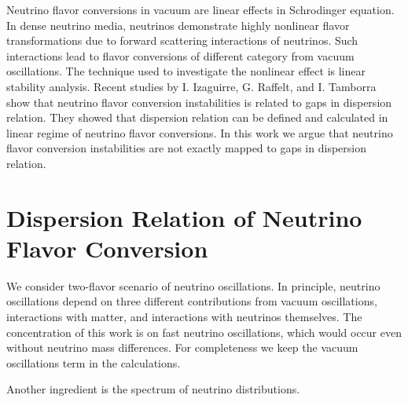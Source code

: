 \documentclass[%
 reprint,
 amsmath,amssymb,
 aps,
 prd
]{revtex4-1}
\begin{document}
Neutrino flavor conversions in vacuum are linear effects in Schrodinger equation. In dense neutrino media, neutrinos demonstrate highly nonlinear flavor transformations due to forward scattering interactions of neutrinos. Such interactions lead to flavor conversions of different category from vacuum oscillations. The technique used to investigate the nonlinear effect is linear stability analysis.\cite{Banerjee2011a,Raffelt2013} Recent studies by I. Izaguirre, G. Raffelt, and I. Tamborra show that neutrino flavor conversion instabilities is related to gaps in dispersion relation.\cite{Izaguirre2016a} They showed that dispersion relation can be defined and calculated in linear regime of neutrino flavor conversions. In this work we argue that neutrino flavor conversion instabilities are not exactly mapped to gaps in dispersion relation.


\section{\label{sec-dr}Dispersion Relation of Neutrino Flavor Conversion}

We consider two-flavor scenario of neutrino oscillations. In principle, neutrino oscillations depend on three different contributions from vacuum oscillations, interactions with matter, and interactions with neutrinos themselves. The concentration of this work is on fast neutrino oscillations, which would occur even without neutrino mass differences. For completeness we keep the vacuum oscillations term in the calculations.

Another ingredient is the spectrum of neutrino distributions. 
\end{document}
